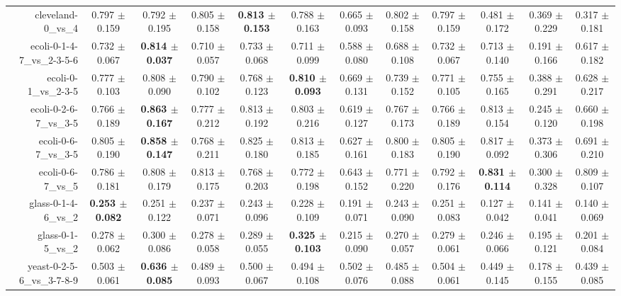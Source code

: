 \begin{table}[!ht]
{\begin{tabular}{r c c c c c c c c c c c}
cleveland-0\_vs\_4 & 0.797 $\pm$ 0.159 & 0.792 $\pm$ 0.195 & 0.805 $\pm$ 0.158 & \textbf{0.813 $\pm$ 0.153} & 0.788 $\pm$ 0.163 & 0.665 $\pm$ 0.093 & 0.802 $\pm$ 0.158 & 0.797 $\pm$ 0.159 & 0.481 $\pm$ 0.172 & 0.369 $\pm$ 0.229 & 0.317 $\pm$ 0.181 \\
ecoli-0-1-4-7\_vs\_2-3-5-6 & 0.732 $\pm$ 0.067 & \textbf{0.814 $\pm$ 0.037} & 0.710 $\pm$ 0.057 & 0.733 $\pm$ 0.068 & 0.711 $\pm$ 0.099 & 0.588 $\pm$ 0.080 & 0.688 $\pm$ 0.108 & 0.732 $\pm$ 0.067 & 0.713 $\pm$ 0.140 & 0.191 $\pm$ 0.166 & 0.617 $\pm$ 0.182 \\
ecoli-0-1\_vs\_2-3-5 & 0.777 $\pm$ 0.103 & 0.808 $\pm$ 0.090 & 0.790 $\pm$ 0.102 & 0.768 $\pm$ 0.123 & \textbf{0.810 $\pm$ 0.093} & 0.669 $\pm$ 0.131 & 0.739 $\pm$ 0.152 & 0.771 $\pm$ 0.105 & 0.755 $\pm$ 0.165 & 0.388 $\pm$ 0.291 & 0.628 $\pm$ 0.217 \\
ecoli-0-2-6-7\_vs\_3-5 & 0.766 $\pm$ 0.189 & \textbf{0.863 $\pm$ 0.167} & 0.777 $\pm$ 0.212 & 0.813 $\pm$ 0.192 & 0.803 $\pm$ 0.216 & 0.619 $\pm$ 0.127 & 0.767 $\pm$ 0.173 & 0.766 $\pm$ 0.189 & 0.813 $\pm$ 0.154 & 0.245 $\pm$ 0.120 & 0.660 $\pm$ 0.198 \\
ecoli-0-6-7\_vs\_3-5 & 0.805 $\pm$ 0.190 & \textbf{0.858 $\pm$ 0.147} & 0.768 $\pm$ 0.211 & 0.825 $\pm$ 0.180 & 0.813 $\pm$ 0.185 & 0.627 $\pm$ 0.161 & 0.800 $\pm$ 0.183 & 0.805 $\pm$ 0.190 & 0.817 $\pm$ 0.092 & 0.373 $\pm$ 0.306 & 0.691 $\pm$ 0.210 \\
ecoli-0-6-7\_vs\_5 & 0.786 $\pm$ 0.181 & 0.808 $\pm$ 0.179 & 0.813 $\pm$ 0.175 & 0.768 $\pm$ 0.203 & 0.772 $\pm$ 0.198 & 0.643 $\pm$ 0.152 & 0.771 $\pm$ 0.220 & 0.792 $\pm$ 0.176 & \textbf{0.831 $\pm$ 0.114} & 0.300 $\pm$ 0.328 & 0.809 $\pm$ 0.107 \\
glass-0-1-4-6\_vs\_2 & \textbf{0.253 $\pm$ 0.082} & 0.251 $\pm$ 0.122 & 0.237 $\pm$ 0.071 & 0.243 $\pm$ 0.096 & 0.228 $\pm$ 0.109 & 0.191 $\pm$ 0.071 & 0.243 $\pm$ 0.090 & 0.251 $\pm$ 0.083 & 0.127 $\pm$ 0.042 & 0.141 $\pm$ 0.041 & 0.140 $\pm$ 0.069 \\
glass-0-1-5\_vs\_2 & 0.278 $\pm$ 0.062 & 0.300 $\pm$ 0.086 & 0.278 $\pm$ 0.058 & 0.289 $\pm$ 0.055 & \textbf{0.325 $\pm$ 0.103} & 0.215 $\pm$ 0.090 & 0.270 $\pm$ 0.057 & 0.279 $\pm$ 0.061 & 0.246 $\pm$ 0.066 & 0.195 $\pm$ 0.121 & 0.201 $\pm$ 0.084 \\
yeast-0-2-5-6\_vs\_3-7-8-9 & 0.503 $\pm$ 0.061 & \textbf{0.636 $\pm$ 0.085} & 0.489 $\pm$ 0.093 & 0.500 $\pm$ 0.067 & 0.494 $\pm$ 0.108 & 0.502 $\pm$ 0.076 & 0.485 $\pm$ 0.088 & 0.504 $\pm$ 0.061 & 0.449 $\pm$ 0.145 & 0.178 $\pm$ 0.155 & 0.439 $\pm$ 0.085 \\

\end{tabular}}
\end{table}
